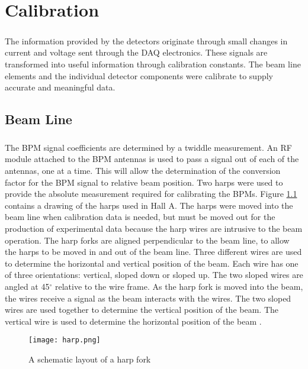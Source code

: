 
\chapter{Calibration}





\paragraph{}The information provided by the detectors originate through small changes in current and voltage sent through the DAQ electronics. These signals are transformed into useful information through calibration constants. The beam line elements and the individual detector components were calibrate to supply accurate and meaningful data. 


\section{Beam Line}
 \paragraph{} The BPM signal coefficients are determined by a twiddle measurement. An RF module attached to the BPM antennas is used to pass a signal out of each of the antennas, one at a time. This will allow the determination of the conversion factor for the BPM signal to relative beam position. Two harps were used to provide the absolute measurement required for calibrating the BPMs. Figure \ref{harp} contains a drawing of the harps used in Hall A. The harps were moved into the beam line when calibration data is needed, but must be moved out for the production of experimental data because the harp wires are intrusive to the beam operation.  The harp forks are aligned perpendicular to the beam line, to allow the harps to be moved in and out of the beam line. Three different wires are used to determine the horizontal and vertical position of the beam. Each wire has one of three orientations: vertical, sloped down or sloped up. The two sloped wires are angled at 45$^{\circ}$ relative to the wire frame. As the harp fork is moved into the beam, the wires receive a signal as the beam interacts with the wires. The two sloped wires are used together to determine the vertical position of the beam. The vertical wire is used to determine the horizontal position of the beam \cite{BPM,BPM2}. 
		 	\begin{figure}[H]
		 		\centering
		 		\caption{A schematic layout of a harp fork \cite{BPM2} }
		 		\label{harp}
		 		\texttt{[image: harp.png]} 
		 	\end{figure}  	
	 
